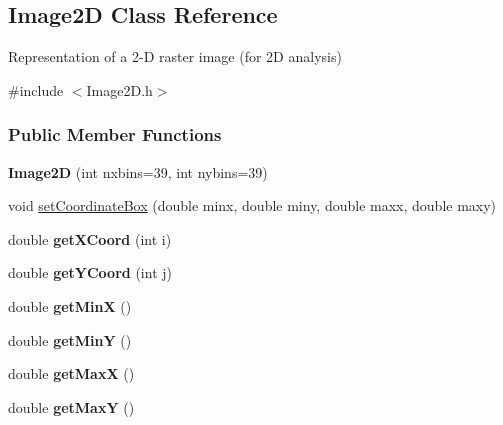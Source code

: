 \hypertarget{classImage2D}{
\subsection{Image2D Class Reference}
\label{classImage2D}
}


Representation of a 2-\/D raster image (for 2D analysis)  




{\ttfamily \#include $<$Image2D.h$>$}

\subsubsection*{Public Member Functions}
\begin{DoxyCompactItemize}
\item 
\hypertarget{classImage2D_a833d693009805f605c8af82d3acec2af}{
{\bfseries Image2D} (int nxbins=39, int nybins=39)}
\label{classImage2D_a833d693009805f605c8af82d3acec2af}

\item 
void \hyperlink{classImage2D_a9b7675f5771a5f4a0f28a5a7772326a0}{setCoordinateBox} (double minx, double miny, double maxx, double maxy)
\item 
\hypertarget{classImage2D_a4daa00c772ba3c6cdbc678fa1ea555d6}{
double {\bfseries getXCoord} (int i)}
\label{classImage2D_a4daa00c772ba3c6cdbc678fa1ea555d6}

\item 
\hypertarget{classImage2D_a3b100d51fdebe1ba7a2987a5d25db71d}{
double {\bfseries getYCoord} (int j)}
\label{classImage2D_a3b100d51fdebe1ba7a2987a5d25db71d}

\item 
\hypertarget{classImage2D_a347193432850999a7704d373841bfe90}{
double {\bfseries getMinX} ()}
\label{classImage2D_a347193432850999a7704d373841bfe90}

\item 
\hypertarget{classImage2D_a5676662e3538d6fea5dfc61d5a5e4140}{
double {\bfseries getMinY} ()}
\label{classImage2D_a5676662e3538d6fea5dfc61d5a5e4140}

\item 
\hypertarget{classImage2D_aeea76c05c63754d99edb452616911185}{
double {\bfseries getMaxX} ()}
\label{classImage2D_aeea76c05c63754d99edb452616911185}

\item 
\hypertarget{classImage2D_a3918d1ddbe2ca3a282268ef8abc0c003}{
double {\bfseries getMaxY} ()}
\label{classImage2D_a3918d1ddbe2ca3a282268ef8abc0c003}


\end{DoxyCompactItemize}
